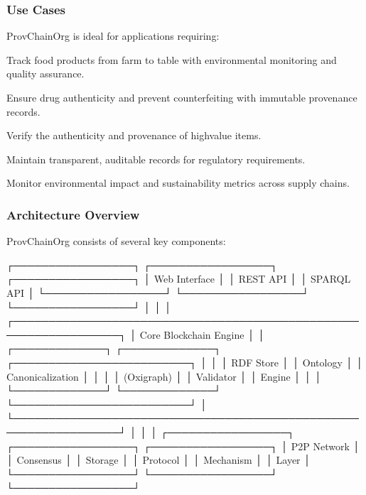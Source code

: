 \documentclass[letterpaper,10pt,english]{sphinxmanual}
\begin{document}
\subsubsection{Use Cases}
\label{\detokenize{foundational/intro-to-provchainorg:use-cases}}
\sphinxAtStartPar
ProvChainOrg is ideal for applications requiring:
\begin{description}
\sphinxAtStartPar
Track food products from farm to table with environmental monitoring and quality assurance.

\sphinxAtStartPar
Ensure drug authenticity and prevent counterfeiting with immutable provenance records.

\sphinxAtStartPar
Verify the authenticity and provenance of high\sphinxhyphen{}value items.

\sphinxAtStartPar
Maintain transparent, auditable records for regulatory requirements.

\sphinxAtStartPar
Monitor environmental impact and sustainability metrics across supply chains.

\end{description}


\subsubsection{Architecture Overview}
\label{\detokenize{foundational/intro-to-provchainorg:architecture-overview}}
\sphinxAtStartPar
ProvChainOrg consists of several key components:

\begin{sphinxVerbatim}[commandchars=\\\{\}]
┌─────────────────┐    ┌─────────────────┐    ┌─────────────────┐
│   Web Interface │    │   REST API      │    │   SPARQL API    │
└─────────────────┘    └─────────────────┘    └─────────────────┘
         │                       │                       │
┌─────────────────────────────────────────────────────────────────┐
│                    Core Blockchain Engine                      │
│  ┌─────────────┐  ┌─────────────┐  ┌─────────────────────────┐ │
│  │ RDF Store   │  │ Ontology    │  │ Canonicalization        │ │
│  │ (Oxigraph)  │  │ Validator   │  │ Engine                  │ │
│  └─────────────┘  └─────────────┘  └─────────────────────────┘ │
└─────────────────────────────────────────────────────────────────┘
         │                       │                       │
┌─────────────────┐    ┌─────────────────┐    ┌─────────────────┐
│   P2P Network   │    │   Consensus     │    │   Storage       │
│   Protocol      │    │   Mechanism     │    │   Layer         │
└─────────────────┘    └─────────────────┘    └─────────────────┘
\end{sphinxVerbatim}
\end{document}
